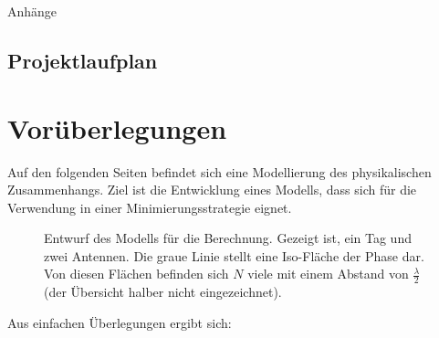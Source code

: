 %
%
%
%

\begin{appendix}
\newpage
\huge{Anhänge}
\normalsize
\begin{landscape}
\section{Projektlaufplan}
\label{sec:projectplan}
  \begin{center}
	\scalebox{.75}{
		
	}
	\end{center}
\newpage
\end{landscape}

\newpage
\section{Vorüberlegungen}
\label{sec:calculations}
Auf den folgenden Seiten befindet sich eine Modellierung des physikalischen Zusammenhangs. Ziel ist die Entwicklung eines Modells, dass sich für die Verwendung in einer Minimierungsstrategie eignet.
\begin{figure}[h]
	\begin{center}
		
		 \caption[Kurzeintrag]{Entwurf des Modells für die Berechnung. Gezeigt ist, ein Tag und zwei Antennen. Die graue Linie stellt eine Iso-Fläche der Phase dar. Von diesen Flächen befinden sich $N$ viele mit einem Abstand von $\frac{\lambda}{2}$ (der Übersicht halber nicht eingezeichnet).} 
	\end{center}
\end{figure}

Aus einfachen Überlegungen ergibt sich:


\end{appendix}
